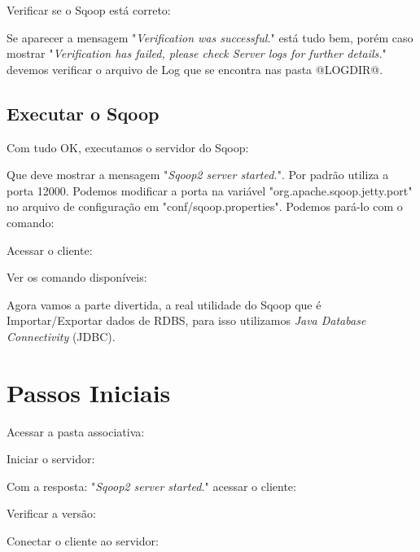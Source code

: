 \documentclass[a4paper,11pt]{article}
\begin{document}
Verificar se o Sqoop está correto: \\

Se aparecer a mensagem "\textit{Verification was successful.}" está tudo bem, porém caso mostrar "\textit{Verification has failed, please check Server logs for further details.}" devemos verificar o arquivo de Log que se encontra nas pasta @LOGDIR@.

\subsection{Executar o Sqoop}
Com tudo OK, executamos o servidor do Sqoop: \\

Que deve mostrar a mensagem "\textit{Sqoop2 server started.}". Por padrão utiliza a porta 12000. Podemos modificar a porta na variável "org.apache.sqoop.jetty.port" no arquivo de configuração em "conf/sqoop.properties". Podemos pará-lo com o comando: \\

Acessar o cliente: \\

Ver os comando disponíveis: \\

Agora vamos a parte divertida, a real utilidade do Sqoop que é Importar/Exportar dados de RDBS, para isso utilizamos \textit{Java Database Connectivity} (JDBC).

\section{Passos Iniciais}
Acessar a pasta associativa: \\

Iniciar o servidor: \\

Com a resposta: "\textit{Sqoop2 server started.}" acessar o cliente: \\

Verificar a versão: \\

Conectar o cliente ao servidor: \\
\end{document}
